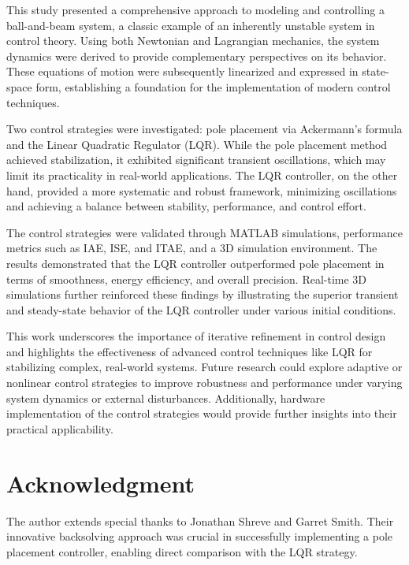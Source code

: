 \documentclass[conference]{IEEEtran}
\begin{document}
This study presented a comprehensive approach to modeling and controlling a ball-and-beam system, a classic example of an inherently unstable system in control theory. Using both Newtonian and Lagrangian mechanics, the system dynamics were derived to provide complementary perspectives on its behavior. These equations of motion were subsequently linearized and expressed in state-space form, establishing a foundation for the implementation of modern control techniques.

Two control strategies were investigated: pole placement via Ackermann’s formula and the Linear Quadratic Regulator (LQR). While the pole placement method achieved stabilization, it exhibited significant transient oscillations, which may limit its practicality in real-world applications. The LQR controller, on the other hand, provided a more systematic and robust framework, minimizing oscillations and achieving a balance between stability, performance, and control effort.

The control strategies were validated through MATLAB simulations, performance metrics such as IAE, ISE, and ITAE, and a 3D simulation environment. The results demonstrated that the LQR controller outperformed pole placement in terms of smoothness, energy efficiency, and overall precision. Real-time 3D simulations further reinforced these findings by illustrating the superior transient and steady-state behavior of the LQR controller under various initial conditions.

This work underscores the importance of iterative refinement in control design and highlights the effectiveness of advanced control techniques like LQR for stabilizing complex, real-world systems. Future research could explore adaptive or nonlinear control strategies to improve robustness and performance under varying system dynamics or external disturbances. Additionally, hardware implementation of the control strategies would provide further insights into their practical applicability.

\section*{Acknowledgment}
The author extends special thanks to Jonathan Shreve and Garret Smith. Their innovative backsolving approach was crucial in successfully implementing a pole placement controller, enabling direct comparison with the LQR strategy.



\end{document}
